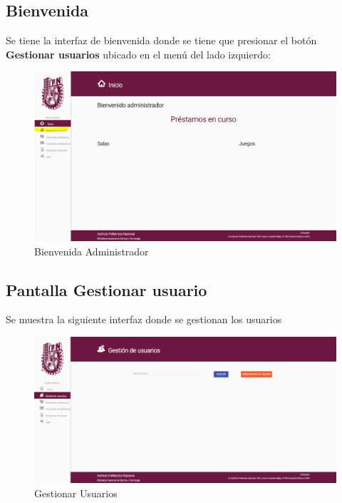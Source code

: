 \subsection{Bienvenida}

Se tiene la interfaz de bienvenida donde se tiene que presionar el botón  \textbf{Gestionar usuarios} ubicado en el menú del lado izquierdo:
	\begin{figure}[hbtp]
		\centering
		\includegraphics[scale=0.3]{images/Interfaz/IUGS22_binevenida.png}
		\caption{Bienvenida Administrador}
	\end{figure}
\subsection{Pantalla Gestionar usuario}
Se muestra la siguiente interfaz donde se gestionan los usuarios

	\begin{figure}[hbtp]
		\centering
		\includegraphics[scale=0.3]{images/Interfaz/IUGS22_gestionarUsuario.png}
		\caption{Gestionar Usuarios}
	\end{figure}